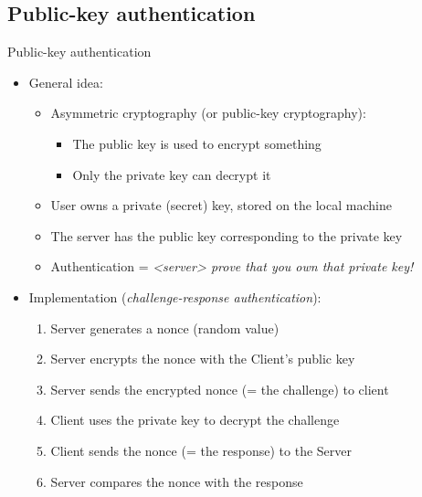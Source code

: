 \documentclass[11pt,final,usepdftitle=false]{beamer}
\begin{document}
\subsection{Public-key authentication}
\begin{frame}{Public-key authentication}
\begin{itemize}
\item General idea:
	\begin{itemize}
		\item Asymmetric cryptography (or public-key cryptography):
			\begin{itemize}
				\item The public key is used to encrypt something
				\item Only the private key can decrypt it
			\end{itemize}
		\item User owns a private (secret) key, stored on the local machine
		\item The server has the public key corresponding to the private key 
		\item Authentication = \textsl{<server> prove that you own that private key!}
	\end{itemize}
\hbr
\item Implementation (\textsl{challenge-response authentication}):
	\begin{enumerate}
		\item Server generates a nonce (random value)
		\item Server encrypts the nonce with the Client's public key
		\item Server sends the encrypted nonce (= the challenge) to client
		\item Client uses the private key to decrypt the challenge
		\item Client sends the nonce (= the response) to the Server
		\item Server compares the nonce with the response
	\end{enumerate}
\end{itemize}
\end{frame}
\end{document}
